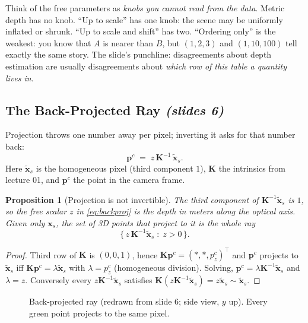 \documentclass[11pt,a4paper]{article}
\numberwithin{equation}{section}
\newcommand{\slides}[1]{\texorpdfstring{\;\emph{(slides #1)}}{ (slides #1)}}
\newcommand{\xt}{\tilde{\mathbf{x}}}
\newcommand{\Kinv}{\bm K^{-1}}
\theoremstyle{plain}
\newtheorem{proposition}[theorem]{Proposition}
\theoremstyle{definition}
\begin{document}
\begin{intuition}
Think of the free parameters as \emph{knobs you cannot read from the data}. Metric depth has no knob. ``Up to scale'' has one knob: the scene may be uniformly inflated or shrunk. ``Up to scale and shift'' has two. ``Ordering only'' is the weakest: you know that $A$ is nearer than $B$, but $(1,2,3)$ and $(1,10,100)$ tell exactly the same story. The slide's punchline: disagreements about depth estimation are usually disagreements about \emph{which row of this table a quantity lives in}.
\end{intuition}
 
\subsection{The Back-Projected Ray \slides{6}}
 
Projection throws one number away per pixel; inverting it asks for that number back:
\begin{equation}\label{eq:backproj}
\bm p^{c} \;=\; z\,\Kinv\,\xt_s .
\end{equation}
Here $\xt_s$ is the homogeneous pixel (third component $1$), $\bm K$ the intrinsics from lecture 01, and $\bm p^c$ the point in the camera frame.
 
\begin{proposition}[Projection is not invertible]\label{prop:ray}
The third component of $\Kinv\xt_s$ is $1$, so the free scalar $z$ in \eqref{eq:backproj} is the depth in meters along the optical axis. Given only $\bm x_s$, the set of 3D points that project to it is the whole ray
\[
\{\, z\,\Kinv\xt_s \;:\; z>0 \,\}.
\]
\end{proposition}
\begin{proof}
Third row of $\bm K$ is $(0,0,1)$, hence $\bm K\bm p^c=(\ast,\ast,p^c_z)^\top$ and $\bm p^c$ projects to $\xt_s$ iff $\bm K\bm p^c=\lambda\xt_s$ with $\lambda=p^c_z$ (homogeneous division). Solving, $\bm p^c=\lambda\Kinv\xt_s$ and $\lambda=z$. Conversely every $z\Kinv\xt_s$ satisfies $\bm K(z\Kinv\xt_s)=z\xt_s\sim\xt_s$. \qedhere
\end{proof}
 
\begin{figure}[htbp]
\centering
{}
\caption{Back-projected ray (redrawn from slide 6; side view, $y$ up). Every green point projects to the same pixel.}\label{fig:ray}
\end{figure}
 
\end{document}
